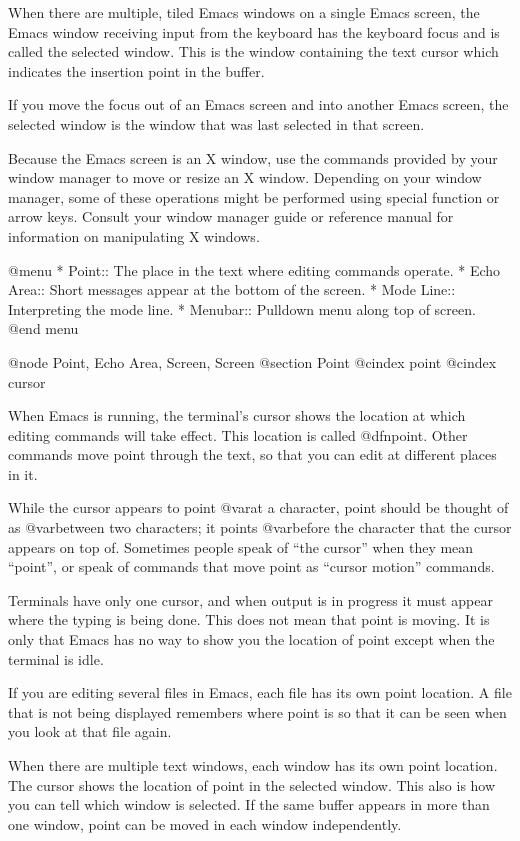   When there are multiple, tiled Emacs windows on a single Emacs 
screen, the Emacs window receiving input from the keyboard has the 
keyboard focus and is called the selected window. This is the 
window containing the text cursor which indicates the 
insertion point in the buffer.

  If you move the focus out of an Emacs screen and into another 
Emacs screen, the selected window is the window 
that was last selected in that screen.

  Because the Emacs screen is an X window, use the commands provided 
by your window manager to move or resize an X window.  
Depending on your window manager, some of these 
operations might be performed using special function or arrow keys. 
Consult your window manager guide or reference manual for 
information on manipulating X windows.

@menu
* Point::	The place in the text where editing commands operate.
* Echo Area::   Short messages appear at the bottom of the screen.
* Mode Line::	Interpreting the mode line.
* Menubar::     Pulldown menu along top of screen.
@end menu

@node Point, Echo Area, Screen, Screen
@section Point
@cindex point
@cindex cursor

  When Emacs is running, the terminal's cursor shows the location at
which editing commands will take effect.  This location is called
@dfn{point}.  Other commands move point through the text, so that you
can edit at different places in it.

  While the cursor appears to point @var{at} a character, point should be
thought of as @var{between} two characters; it points @var{before} the character
that the cursor appears on top of.  Sometimes people speak of ``the
cursor'' when they mean ``point'', or speak of commands that move point as
``cursor motion'' commands.

  Terminals have only one cursor, and when output is in progress it must
appear where the typing is being done.  This does not mean that point is
moving.  It is only that Emacs has no way to show you the location of point
except when the terminal is idle.

  If you are editing several files in Emacs, each file has its own point
location.  A file that is not being displayed remembers where point is so
that it can be seen when you look at that file again.

  When there are multiple text windows, each window has its own point
location.  The cursor shows the location of point in the selected window.
This also is how you can tell which window is selected.  If the same buffer
appears in more than one window, point can be moved in each window
independently.

